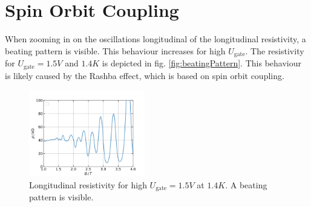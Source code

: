 \section{Spin Orbit Coupling}

When zooming in on the oscillations longitudinal of the longitudinal resistivity, 
a beating pattern is visible.
This behaviour increases for high $U_\text{gate}$.
The resistivity for $U_\text{gate} = 1.5V$ and $1.4K$ is depicted in fig. \ref{fig:beatingPattern}.
This behaviour is likely caused by the Rashba effect, which is based on spin orbit coupling.
\begin{figure}[h]
    \centering
    \includegraphics[width=0.45\textwidth]{../Images/beatingPattern.png}
    \caption{Longitudinal resistivity \rxx for high $U_\text{gate} = 1.5V$ at $1.4K$.
    A beating pattern is visible.
    }
    \label{fig:HallBar}
\end{figure}

